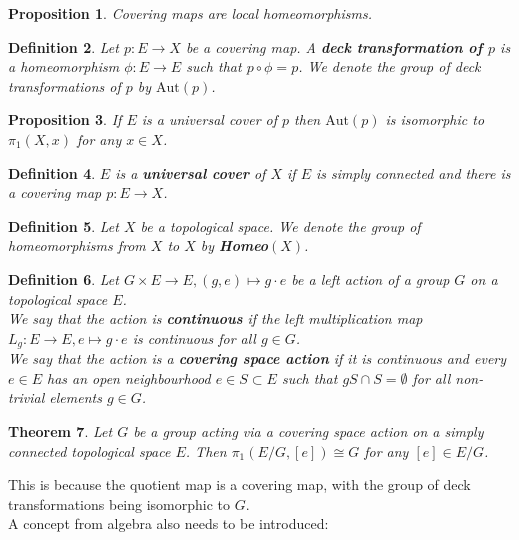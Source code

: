 \documentclass{article}
\newtheorem{theorem}{Theorem}[section]
\newtheorem{definition}[theorem]{Definition}
\newtheorem{proposition}[theorem]{Proposition}
\begin{document}
\begin{proposition}
Covering maps are local homeomorphisms.
\end{proposition}

\begin{definition}
Let $p:E\to X$ be a covering map. A \textbf{deck transformation of $p$} is a homeomorphism $\phi:E\to E$ such that $p\circ\phi=p$. We denote the group of deck transformations of $p$ by $\text{Aut}(p)$.
\end{definition}

\begin{proposition}
If $E$ is a universal cover of $p$ then $\text{Aut}(p)$ is isomorphic to $\pi_1(X,x)$ for any $x\in X$.
\end{proposition}

\begin{definition}
$E$ is a \textbf{universal cover} of $X$ if $E$ is simply connected and there is a covering map $p:E\to X$.
\end{definition}

\begin{definition}
Let $X$ be a topological space. We denote the group of homeomorphisms from $X$ to $X$ by \textbf{Homeo$(X)$}.
\end{definition}

\begin{definition}
Let $G\times E\to E,(g,e)\mapsto g\cdot e$ be a left action of a group $G$ on a topological space $E$.\\
We say that the action is \textbf{continuous} if the left multiplication map $L_g\colon E\to E,e\mapsto g\cdot e$ is continuous for all $g\in G$.\\
We say that the action is a \textbf{covering space action} if it is continuous and every $e\in E$ has an open neighbourhood $e\in S\subset E$ such that $gS\cap S=\emptyset$ for all non-trivial elements $g\in G$.
\end{definition}

\begin{theorem}
Let $G$ be a group acting via a covering space action on a simply connected topological space $E$. Then $\pi_1(E/G,[e])\cong G$ for any $[e]\in E/G$.
\end{theorem}

\noindent This is because the quotient map is a covering map, with the group of deck transformations being isomorphic to $G$.\\

\noindent A concept from algebra also needs to be introduced:
\end{document}
